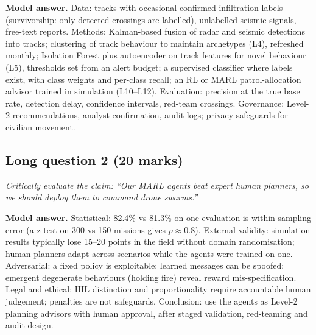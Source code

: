 \documentclass[11pt]{article}
\begin{document}
\textbf{Model answer.} Data: tracks with occasional confirmed infiltration labels (survivorship: only detected crossings are labelled), unlabelled seismic signals, free-text reports. Methods: Kalman-based fusion of radar and seismic detections into tracks; clustering of track behaviour to maintain archetypes (L4), refreshed monthly; Isolation Forest plus autoencoder on track features for novel behaviour (L5), thresholds set from an alert budget; a supervised classifier where labels exist, with class weights and per-class recall; an RL or MARL patrol-allocation advisor trained in simulation (L10--L12). Evaluation: precision at the true base rate, detection delay, confidence intervals, red-team crossings. Governance: Level-2 recommendations, analyst confirmation, audit logs; privacy safeguards for civilian movement.

\subsection{Long question 2 (20 marks)}
\emph{Critically evaluate the claim: ``Our MARL agents beat expert human planners, so we should deploy them to command drone swarms.''}

\textbf{Model answer.} Statistical: 82.4\% vs 81.3\% on one evaluation is within sampling error (a z-test on 300 vs 150 missions gives $p\approx0.8$). External validity: simulation results typically lose 15--20 points in the field without domain randomisation; human planners adapt across scenarios while the agents were trained on one. Adversarial: a fixed policy is exploitable; learned messages can be spoofed; emergent degenerate behaviours (holding fire) reveal reward mis-specification. Legal and ethical: IHL distinction and proportionality require accountable human judgement; penalties are not safeguards. Conclusion: use the agents as Level-2 planning advisors with human approval, after staged validation, red-teaming and audit design.
\end{document}
